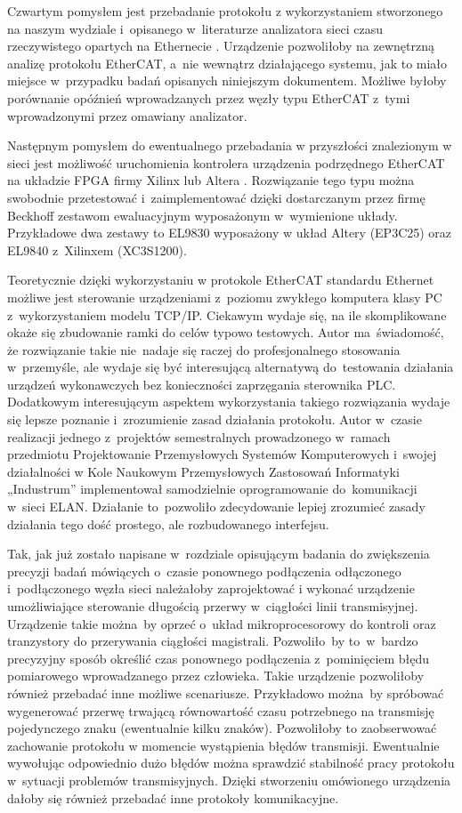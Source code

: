 Czwartym pomysłem jest przebadanie protokołu z wykorzystaniem stworzonego na naszym wydziale i~opisanego w~literaturze analizatora sieci czasu rzeczywistego opartych na Ethernecie \cite{projekt_FPGA}. Urządzenie pozwoliłoby na zewnętrzną analizę protokołu EtherCAT, a~nie wewnątrz działającego systemu, jak to miało miejsce w~przypadku badań opisanych niniejszym dokumentem. Możliwe byłoby porównanie opóźnień wprowadzanych przez węzły typu EtherCAT z~tymi wprowadzonymi przez omawiany analizator.

Następnym pomysłem do ewentualnego przebadania w przyszłości znalezionym w sieci jest możliwość uruchomienia kontrolera urządzenia podrzędnego EtherCAT na układzie FPGA firmy Xilinx lub Altera \cite{FPGA_Xilinx, FPGA_Altera}. Rozwiązanie tego typu można swobodnie przetestować i~zaimplementować dzięki dostarczanym przez firmę Beckhoff zestawom ewaluacyjnym wyposażonym w~wymienione układy. Przykładowe dwa zestawy to EL9830 wyposażony w układ Altery (EP3C25) oraz EL9840 z~Xilinxem (XC3S1200).

Teoretycznie dzięki wykorzystaniu w protokole EtherCAT standardu Ethernet możliwe jest sterowanie urządzeniami z~poziomu zwykłego komputera klasy PC z~wykorzystaniem modelu TCP/IP. Ciekawym wydaje się, na ile skomplikowane okaże się zbudowanie ramki do celów typowo testowych. Autor ma~świadomość, że rozwiązanie takie nie~nadaje się raczej do profesjonalnego stosowania w~przemyśle, ale wydaje się być interesującą alternatywą do~testowania działania urządzeń wykonawczych bez konieczności zaprzęgania sterownika PLC. Dodatkowym interesującym aspektem wykorzystania takiego rozwiązania wydaje się lepsze poznanie i~zrozumienie zasad działania protokołu. Autor w~czasie realizacji jednego z~projektów semestralnych prowadzonego w~ramach przedmiotu Projektowanie Przemysłowych Systemów Komputerowych i~swojej działalności w Kole Naukowym Przemysłowych Zastosowań Informatyki „Industrum” implementował samodzielnie oprogramowanie do~komunikacji w~sieci ELAN. Działanie to~pozwoliło zdecydowanie lepiej zrozumieć zasady działania tego dość prostego, ale rozbudowanego interfejsu.

Tak, jak już zostało napisane w~rozdziale opisującym badania do zwiększenia precyzji badań mówiących o~czasie ponownego podłączenia odłączonego i~podłączonego węzła sieci należałoby zaprojektować i wykonać urządzenie umożliwiające sterowanie długością przerwy w~ciągłości linii transmisyjnej. Urządzenie takie można~by oprzeć o~układ mikroprocesorowy do kontroli oraz tranzystory do przerywania ciągłości magistrali. Pozwoliło~by to~w~bardzo precyzyjny sposób określić czas ponownego podłączenia z~pominięciem błędu pomiarowego wprowadzanego przez człowieka. Takie urządzenie pozwoliłoby również przebadać inne możliwe scenariusze. Przykładowo można~by spróbować wygenerować przerwę trwającą równowartość czasu potrzebnego na transmisję pojedynczego znaku (ewentualnie kilku znaków). Pozwoliłoby to zaobserwować zachowanie protokołu w momencie wystąpienia błędów transmisji. Ewentualnie wywołując odpowiednio dużo błędów można sprawdzić stabilność pracy protokołu w~sytuacji problemów transmisyjnych.
Dzięki stworzeniu omówionego urządzenia dałoby się również przebadać inne protokoły komunikacyjne.
